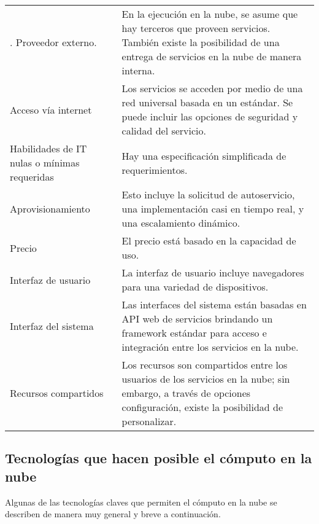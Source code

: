 \begin{savenotes}\sphinxattablestart
\centering
{}
\label{\detokenize{chapter_one/cloud_computing:key-cloud-services-attr}}
\sphinxaftercaption
\begin{tabulary}{\linewidth}[t]{|T|T|}
\hline
{}\relax &\relax \\
\hline
{}. Proveedor externo.
&
En la ejecución en la nube, se asume que hay terceros que proveen servicios. También existe la posibilidad de una entrega de servicios en la nube de manera interna.
\\
\hline
Acceso vía internet
&
Los servicios se acceden por medio de una red universal basada en un estándar. Se puede incluir las opciones de seguridad y calidad del servicio.
\\
\hline
Habilidades de IT nulas o mínimas requeridas
&
Hay una especificación simplificada de requerimientos.
\\
\hline
Aprovisionamiento
&
Esto incluye la solicitud de autoservicio, una implementación casi en tiempo real, y una escalamiento dinámico.
\\
\hline
Precio
&
El precio está basado en la capacidad de uso.
\\
\hline
Interfaz de usuario
&
La interfaz de usuario incluye navegadores para una variedad de dispositivos.
\\
\hline
Interfaz del sistema
&
Las interfaces del sistema están basadas en API web de servicios brindando un framework estándar para acceso e integración entre los servicios en la nube.
\\
\hline
Recursos compartidos
&
Los recursos son compartidos entre los usuarios de los servicios en la nube; sin embargo, a través de opciones configuración, existe la posibilidad de personalizar.
\\
\hline
\end{tabulary}
\par
\sphinxattableend\end{savenotes}


\subsection{Tecnologías que hacen posible el cómputo en la nube}
\label{\detokenize{chapter_one/cloud_computing:tecnologias-que-hacen-posible-el-computo-en-la-nube}}
Algunas de las tecnologías claves que permiten el cómputo en la nube se describen
de manera muy general y breve a continuación.



